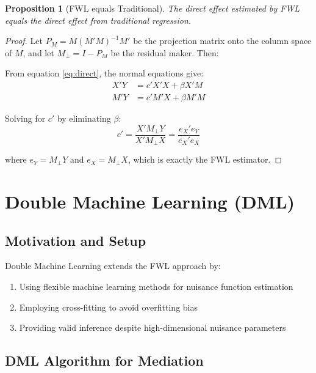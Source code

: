\documentclass[11pt,a4paper]{article}
\newtheorem{proposition}[theorem]{Proposition}
\begin{document}
\begin{proposition}[FWL equals Traditional]
The direct effect estimated by FWL equals the direct effect from traditional regression.
\end{proposition}

\begin{proof}
Let $P_M = M(M'M)^{-1}M'$ be the projection matrix onto the column space of $M$, and let $M_\perp = I - P_M$ be the residual maker. Then:

From equation \eqref{eq:direct}, the normal equations give:
\begin{align}
X'Y &= c' X'X + \beta X'M \\
M'Y &= c' M'X + \beta M'M
\end{align}

Solving for $c'$ by eliminating $\beta$:
\begin{equation}
c' = \frac{X'M_\perp Y}{X'M_\perp X} = \frac{e_X' e_Y}{e_X' e_X}
\end{equation}

where $e_Y = M_\perp Y$ and $e_X = M_\perp X$, which is exactly the FWL estimator.
\end{proof}

\section{Double Machine Learning (DML)}

\subsection{Motivation and Setup}

Double Machine Learning \citep{chernozhukov2018double} extends the FWL approach by:
\begin{enumerate}
    \item Using flexible machine learning methods for nuisance function estimation
    \item Employing cross-fitting to avoid overfitting bias
    \item Providing valid inference despite high-dimensional nuisance parameters
\end{enumerate}

\subsection{DML Algorithm for Mediation}
\end{document}
